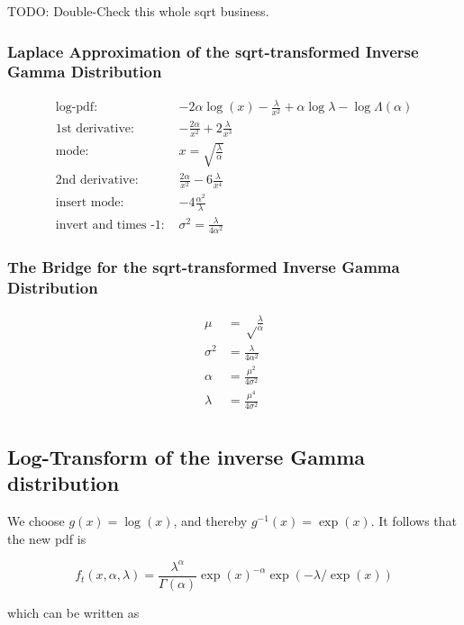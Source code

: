 TODO: Double-Check this whole sqrt business.

\subsubsection{Laplace Approximation of the sqrt-transformed Inverse Gamma Distribution}

\begin{align*}
\text{log-pdf: } &-2\alpha\log(x) - \frac{\lambda}{x^2} + \alpha \log \lambda - \log\Lambda(\alpha) \\
\text{1st derivative: }& -\frac{2\alpha}{x^2} + 2\frac{\lambda}{x^3} \\
\text{mode: }&  x = \sqrt{\frac{\lambda}{\alpha}}\\
\text{2nd derivative: }&  \frac{2\alpha}{x^2} - 6\frac{\lambda}{x^4}\\
\text{insert mode: }&  -4\frac{\alpha^2}{\lambda}\\
\text{invert and times -1: }&\sigma^2 = \frac{\lambda}{4 \alpha^2}
\end{align*}

\subsubsection{The Bridge for the sqrt-transformed Inverse Gamma Distribution}

\begin{align}
\mu &= \sqrt\frac{\lambda}{\alpha} \\
\sigma^2 &= \frac{\lambda}{4\alpha^2} \\
\alpha &= \frac{\mu^2}{4\sigma^2}\\
\lambda &= \frac{\mu^4}{4\sigma^2}\\
\end{align}

\subsection{Log-Transform of the inverse Gamma distribution}

We choose $g(x) = \log(x)$, and thereby $g^{-1}(x) = \exp(x)$. It follows that the new pdf is 

\begin{equation}
	f_t(x, \alpha, \lambda) = \frac{\lambda^{\alpha}}{\Gamma(\alpha)} \exp(x)^{-\alpha} \exp(-\lambda/\exp(x))
	\label{eq:inv_gamma_trans_pdf}
\end{equation}

which can be written as 

